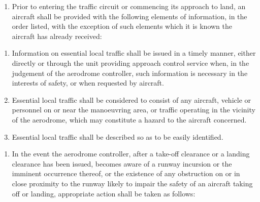\begin{enumeratesc}
\begin{enumerate}
        \item Prior to entering the traffic circuit or commencing its approach to land, an aircraft shall be provided with the following elements of information, in the order listed, with the exception of such elements which it is known the aircraft has already received:


    \end{enumerate}

    \begin{enumerate}
        \item Information on essential local traffic shall be issued in a timely manner, either directly or through the unit providing approach control service when, in the judgement of the aerodrome controller, such information is necessary in the interests of safety, or when requested by aircraft.
        \item Essential local traffic shall be considered to consist of any aircraft, vehicle or personnel on or near the manoeuvring area, or traffic operating in the vicinity of the aerodrome, which may constitute a hazard to the aircraft concerned.
        \item Essential local traffic shall be described so as to be easily identified.
    \end{enumerate}

    \begin{enumerate}
        \item In the event the aerodrome controller, after a take-off clearance or a landing clearance has been issued, becomes aware of a runway incursion or the imminent occurrence thereof, or the existence of any obstruction on or in close proximity to the runway likely to impair the safety of an aircraft taking off or landing, appropriate action shall be taken as follows:


\end{enumerate}
\end{enumeratesc}
